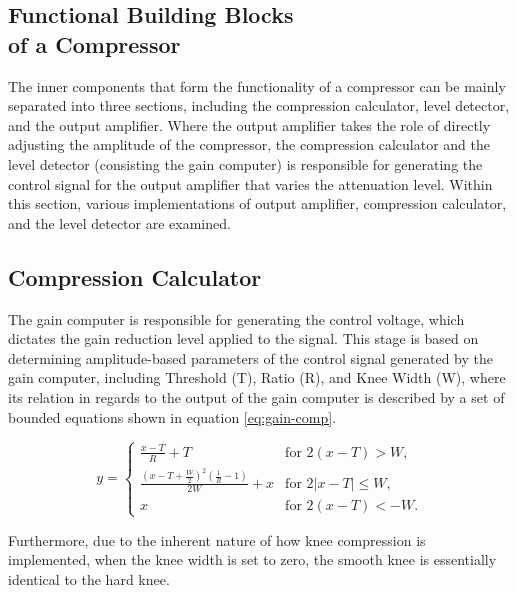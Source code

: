 \documentclass[10pt]{article}
\begin{document}
\begin{multicols*}{2}
        \section[Functional Building Blocks of a Compressor]{Functional Building Blocks\\of a Compressor}
            The inner components that form the functionality of a compressor can be mainly separated into three sections, including the compression calculator, level detector, and the output amplifier. Where the output amplifier takes the role of directly adjusting the amplitude of the compressor, the compression calculator and the level detector (consisting the gain computer) is responsible for generating the control signal for the output amplifier that varies the attenuation level. Within this section, various implementations of output amplifier, compression calculator, and the level detector are examined.

            \subsection{Compression Calculator}
                The gain computer is responsible for generating the control voltage, which dictates the gain reduction level applied to the signal. This stage is based on determining amplitude-based parameters of the control signal generated by the gain computer, including Threshold (T), Ratio (R), and Knee Width (W), where its relation in regards to the output of the gain computer is described by a set of bounded equations shown in equation \ref{eq:gain-comp}.

                    \begin{equation}
                        y=
                        \begin{cases}
                            \frac{x-T}{R}+T & \text{for $2(x-T)>W$},\\[5pt]
                            \frac{(x-T+\frac{W}{2})^2(\frac{1}{R}-1)}{2W}+x & \text{for $2\left\lvert x-T\right\rvert\leq W$},\\[5pt]
                            x & \text{for $2(x-T)<-W$}.
                        \end{cases}
                        \label{eq:gain-comp}
                    \end{equation}

                \noindent Furthermore, due to the inherent nature of how knee compression is implemented, when the knee width is set to zero, the smooth knee is essentially identical to the hard knee.
            

\end{multicols*}
\end{document}
